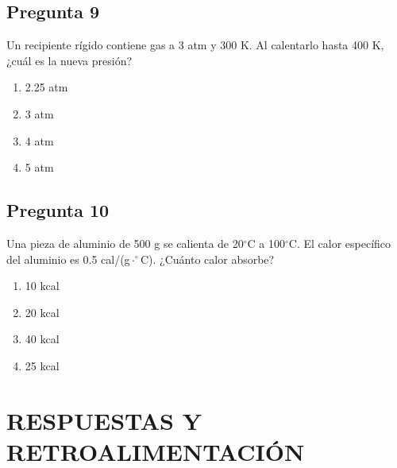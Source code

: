 \begin{preguntabox}
\subsection*{Pregunta 9}
Un recipiente rígido contiene gas a 3 atm y 300 K. Al calentarlo hasta 400 K, ¿cuál es la nueva presión?

\begin{enumerate}
    \item[A)] 2.25 atm
    \item[B)] 3 atm
    \item[C)] 4 atm
    \item[D)] 5 atm
\end{enumerate}
\end{preguntabox}

\begin{preguntabox}
\subsection*{Pregunta 10}
Una pieza de aluminio de 500 g se calienta de 20$^\circ$C a 100$^\circ$C. El calor específico del aluminio es 0.5 cal/(g$\cdot^\circ$C). ¿Cuánto calor absorbe?

\begin{enumerate}
    \item[A)] 10 kcal
    \item[B)] 20 kcal
    \item[C)] 40 kcal
    \item[D)] 25 kcal
\end{enumerate}
\end{preguntabox}

\newpage
\onecolumn
\section*{RESPUESTAS Y RETROALIMENTACIÓN}

